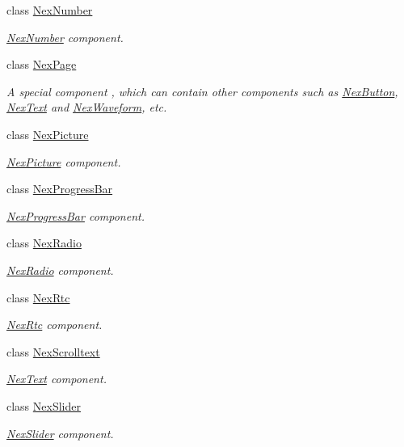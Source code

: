 \begin{DoxyCompactItemize}
class \hyperlink{class_nex_number}{Nex\+Number}
\begin{DoxyCompactList}\small\item\em \hyperlink{class_nex_number}{Nex\+Number} component. \end{DoxyCompactList}\item 
class \hyperlink{class_nex_page}{Nex\+Page}
\begin{DoxyCompactList}\small\item\em A special component , which can contain other components such as \hyperlink{class_nex_button}{Nex\+Button}, \hyperlink{class_nex_text}{Nex\+Text} and \hyperlink{class_nex_waveform}{Nex\+Waveform}, etc. \end{DoxyCompactList}\item 
class \hyperlink{class_nex_picture}{Nex\+Picture}
\begin{DoxyCompactList}\small\item\em \hyperlink{class_nex_picture}{Nex\+Picture} component. \end{DoxyCompactList}\item 
class \hyperlink{class_nex_progress_bar}{Nex\+Progress\+Bar}
\begin{DoxyCompactList}\small\item\em \hyperlink{class_nex_progress_bar}{Nex\+Progress\+Bar} component. \end{DoxyCompactList}\item 
class \hyperlink{class_nex_radio}{Nex\+Radio}
\begin{DoxyCompactList}\small\item\em \hyperlink{class_nex_radio}{Nex\+Radio} component. \end{DoxyCompactList}\item 
class \hyperlink{class_nex_rtc}{Nex\+Rtc}
\begin{DoxyCompactList}\small\item\em \hyperlink{class_nex_rtc}{Nex\+Rtc} component. \end{DoxyCompactList}\item 
class \hyperlink{class_nex_scrolltext}{Nex\+Scrolltext}
\begin{DoxyCompactList}\small\item\em \hyperlink{class_nex_text}{Nex\+Text} component. \end{DoxyCompactList}\item 
class \hyperlink{class_nex_slider}{Nex\+Slider}
\begin{DoxyCompactList}\small\item\em \hyperlink{class_nex_slider}{Nex\+Slider} component. \end{DoxyCompactList}\item 

\end{DoxyCompactItemize}
